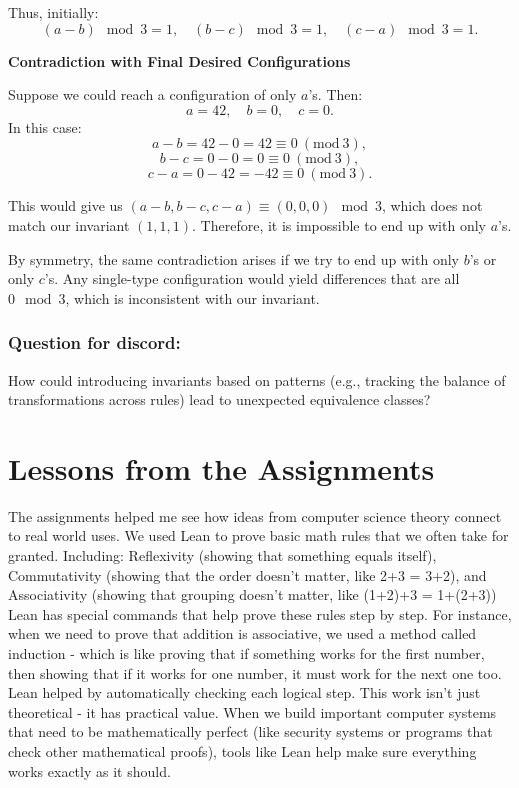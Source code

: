\documentclass{article}
\theoremstyle{theorem}
\theoremstyle{definition}
\theoremstyle{remark}
\begin{document}
Thus, initially:
\[
(a-b) \mod 3 = 1, \quad (b-c) \mod 3 = 1, \quad (c-a) \mod 3 = 1.
\]

\textbf{Contradiction with Final Desired Configurations}

Suppose we could reach a configuration of only \(a\)'s. Then:
\[
a = 42, \quad b = 0, \quad c = 0.
\]
In this case:
\[
a-b = 42 - 0 = 42 \equiv 0 \ (\mathrm{mod}\ 3),
\]
\[
b-c = 0 - 0 = 0 \equiv 0 \ (\mathrm{mod}\ 3),
\]
\[
c-a = 0 - 42 = -42 \equiv 0 \ (\mathrm{mod}\ 3).
\]

This would give us \((a-b,b-c,c-a) \equiv (0,0,0) \mod 3\), which does not match our invariant \((1,1,1)\). Therefore, it is impossible to end up with only \(a\)'s.

By symmetry, the same contradiction arises if we try to end up with only \(b\)'s or only \(c\)'s. Any single-type configuration would yield differences that are all \(0 \mod 3\), which is inconsistent with our invariant.




\subsubsection*{Question for discord:}
How could introducing invariants based on patterns (e.g., tracking the balance of transformations across rules) lead to unexpected equivalence classes?
  

\section{Lessons from the Assignments}

The assignments helped me see how ideas from computer science theory connect to real world uses. 
We used Lean to prove basic math rules that we often take for granted. Including: Reflexivity
(showing that something equals itself), Commutativity (showing that the order doesn't matter, 
like 2+3 = 3+2), and Associativity (showing that grouping doesn't matter, like (1+2)+3 = 1+(2+3))
Lean has special commands that help prove these rules step by step. For instance, when we need 
to prove that addition is associative, we used a method called induction - which is like proving 
that if something works for the first number, then showing that if it works for one number, it 
must work for the next one too. Lean helped by automatically checking each logical step. This 
work isn't just theoretical - it has practical value. When we build important computer systems 
that need to be mathematically perfect (like security systems or programs that check other 
mathematical proofs), tools like Lean help make sure everything works exactly as it should.
\end{document}
